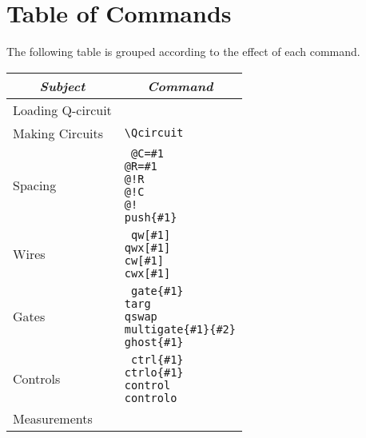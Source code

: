 \documentclass[twocolumn,nofootinbib]{revtex4}
\begin{document}
\pagebreak

\section{Table of Commands}

The following table is grouped according to the effect of each command.\\

{\small \begin{center}
    \begin{tabular}{l | l } 
        \multicolumn{1}{c}{\itshape Subject} & \multicolumn{1}{c}{\itshape Command }\\ \hline 
        Loading Q-circuit \hspace{.5em} & \verb== \\
        Making Circuits & \verb=\Qcircuit= \\
        Spacing & \parbox[t]{6cm}{\tt
                    @C=\#1 \\
                    @R=\#1 \\
                    @!R \\
                    @!C \\
                    @! \\
                     push\{\#1\}} \\
        Wires & \parbox[t]{6cm}{\tt
                     qw[\#1] \\
                     qwx[\#1] \\
                     cw[\#1] \\
                     cwx[\#1] }\\
        Gates & \parbox[t]{6cm}{\tt
                     gate\{\#1\} \\
                     targ \\
                     qswap \\
                     multigate\{\#1\}\{\#2\} \\
                     ghost\{\#1\} }\\
        Controls & \parbox[t]{6cm}{\tt
                     ctrl\{\#1\} \\
                     ctrlo\{\#1\} \\
                     control \\
                     controlo } \\
        Measurements & \parbox[t]{6cm}{\tt
}
\end{tabular}
\end{center}}
\end{document}
